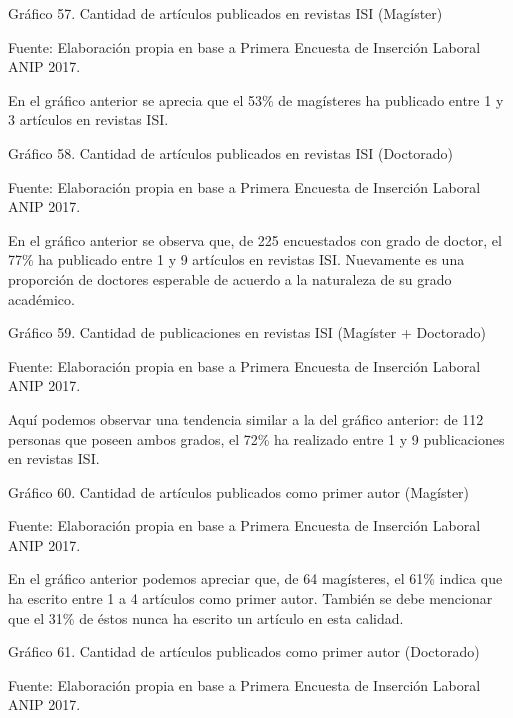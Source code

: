 \documentclass{article}
\begin{document}
Gráfico 57. Cantidad de artículos publicados en revistas ISI (Magíster)


Fuente: Elaboración propia en base a Primera Encuesta de Inserción Laboral ANIP 2017.

En el gráfico anterior se aprecia que el 53\% de magísteres ha publicado entre 1 y 3 artículos en revistas ISI.

Gráfico 58. Cantidad de artículos publicados en revistas ISI (Doctorado)


Fuente: Elaboración propia en base a Primera Encuesta de Inserción Laboral ANIP 2017.

En el gráfico anterior se observa que, de 225 encuestados con grado de doctor, el 77\% ha publicado entre 1 y 9 artículos en revistas ISI. Nuevamente es una proporción de doctores esperable de acuerdo a la naturaleza de su grado académico.

Gráfico 59. Cantidad de publicaciones en revistas ISI (Magíster + Doctorado)


Fuente: Elaboración propia en base a Primera Encuesta de Inserción Laboral ANIP 2017.

Aquí podemos observar una tendencia similar a la del gráfico anterior: de 112 personas que poseen ambos grados, el 72\% ha realizado entre 1 y 9 publicaciones en revistas ISI.

Gráfico 60. Cantidad de artículos publicados como primer autor (Magíster)


Fuente: Elaboración propia en base a Primera Encuesta de Inserción Laboral ANIP 2017.

En el gráfico anterior podemos apreciar que, de 64 magísteres, el 61\% indica que ha escrito entre 1 a 4 artículos como primer autor. También se debe mencionar que el 31\% de éstos nunca ha escrito un artículo en esta calidad.

Gráfico 61. Cantidad de artículos publicados como primer autor (Doctorado)


Fuente: Elaboración propia en base a Primera Encuesta de Inserción Laboral ANIP 2017.
\end{document}
